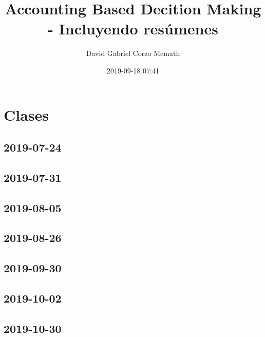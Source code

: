 \documentclass{book}
\author{David Gabriel Corzo Mcmath}
\title{Accounting Based Decition Making - Incluyendo resúmenes}
\date{2019-09-18 07:41}
\begin{document}
\maketitle
\tableofcontents


\part{Clases}

\chapter{2019-07-24}
 

\chapter{2019-07-31}
 

\chapter{2019-08-05}
 

\chapter{2019-08-26}


\chapter{2019-09-30}
 

\chapter{2019-10-02}
 

\chapter{2019-10-30}

\end{document}
